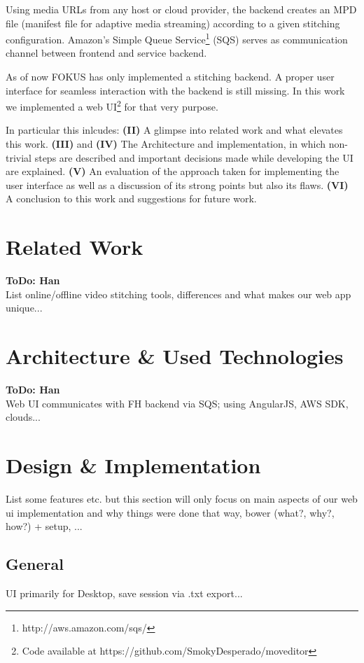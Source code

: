 \documentclass[conference]{IEEEtran}
\begin{document}
Using media URLs from any host or cloud provider, the backend creates an MPD file (manifest file for adaptive media streaming\cite{Sodagar}) according to a given stitching configuration.
Amazon's Simple Queue Service\footnote{http://aws.amazon.com/sqs/} (SQS) serves as communication channel between frontend and service backend.

As of now FOKUS has only implemented a stitching backend. A proper user interface for seamless interaction with the backend is still missing.
In this work we implemented a web UI\footnote{Code available at https://github.com/SmokyDesperado/moveditor} for that very purpose.

In particular this inlcudes:
\textbf{(II)} A glimpse into related work and what elevates this work.
\textbf{(III)} and \textbf{(IV)} The Architecture and implementation, in which non-trivial steps are described and important decisions made while developing the UI are explained.
\textbf{(V)} An evaluation of the approach taken for implementing the user interface as well as a discussion of its strong points but also its flaws.
\textbf{(VI)} A conclusion to this work and suggestions for future work.

\section{Related Work}
\textbf{ToDo: Han} \\
List online/offline video stitching tools, differences and what makes our web app unique...

\section{Architecture \& Used Technologies}
\textbf{ToDo: Han} \\
Web UI communicates with FH backend via SQS; using AngularJS, AWS SDK, clouds...

\section{Design \& Implementation}
List some features etc. but this section will only focus on main aspects of our web ui implementation and why things were done that way, bower (what?, why?, how?) + setup, ...

\subsection{General}
UI primarily for Desktop, save session via .txt export...
\end{document}
